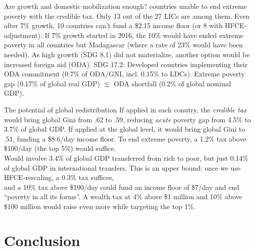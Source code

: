 \documentclass[aspectratio=169,xcolor=dvipsnames, 11pt,mathserif]{beamer}
\begin{document}
\begin{frame}{Are growth and domestic mobilization enough?}   
    \bbsp 
     countries unable to end extreme poverty with the credible tax.
    \ip Only 13 out of the 27 LICs are among them. %
    \ip Even after 7\% growth, 10 countries can't fund a \$2.15 income floor (or 8 with HFCE-adjustment).
    \ip If 7\% growth started in 2016, the 10\% would have ended extreme poverty in all countries but Madagascar (where a rate of 23\% would have been needed).
    \ip As high growth (SDG 8.1) did not materialize, another option would be increased foreign aid (ODA).
    \ip SDG 17.2: Developed countries implementing their ODA commitment (0.7\% of ODA/GNI, incl. 0.15\% to LDCs).
    \ip Extreme poverty gap (0.17\% of global real GDP) $\lesssim$ ODA shortfall (0.2\% of global nominal GDP).
    \ee 
\end{frame}

\begin{frame}{The potential of global redistribution}
    \bbsp \ip If applied in each conutry, the \textit{credible tax} would bring global Gini from .62 to .59, reducing \textit{acute} poverty gap from 4.5\% to 3.7\% of global GDP.
    \ip If applied at the global level, it would bring global Gini to .51, funding a \$8.6/day income floor.
    \ip To end extreme poverty, a 1.2\% tax above \$100/day (the top 5\%) would suffice. \\ Would involve 3.4\% of global GDP transferred from rich to poor, but just 0.14\% of global GDP in international transfers.
    \ip This is an upper bound: once we use HFCE-rescaling, a 0.3\% tax suffices, \\ and a 10\% tax above \$100/day could fund an income floor of \$7/day and end ``poverty in all its forms''.
    \ip A wealth tax at 4\% above \$1 million and 10\% above \$100 million would raise even more while targeting the top 1\%.
    \ee
\end{frame}

\section{Conclusion}
\end{document}
